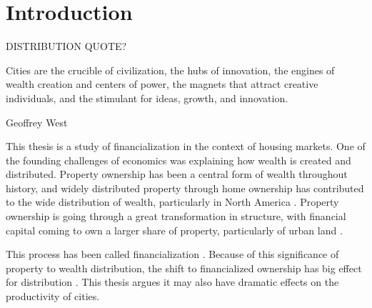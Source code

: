 \chapter{Introduction} \label{chapter-introduction}

\epigraph{DISTRIBUTION QUOTE?}{}
\epigraph{Cities are the crucible of civilization, the hubs of innovation, the engines of wealth creation and centers of power, the magnets that attract creative individuals, and the stimulant for ideas, growth, and innovation.}{Geoffrey West}

This thesis is a study of financialization in the context of housing markets.
One of the founding challenges of economics was explaining how wealth is created and distributed. Property ownership has  been a central form of wealth %
throughout history,  
and widely distributed property through home ownership has contributed to the wide distribution of wealth, particularly in North America \cite{pikettyCapitalTwentyfirstCentury2014}. %
Property ownership is going through a great transformation in structure, with financial capital coming to own a larger share of property,  particularly of urban land \cite{farhaReportFinancializationHousing2017, palleyFinancializationWhatIt2007}. %

This process has been called financialization \cite{farhaReportFinancializationHousing2017, hansenFinanceCapitalismFinancialization2014}. 
Because of this significance of property to wealth distribution, the shift to financialized ownership %
has big effect for distribution \cite{tomaskovic-deveyFinancializationCausesInequality2013, palleyFinancializationWhatIt2007, seccarecciaUnderstandingFinancializationHistory2013, nemtinFinancializationHousingSocial2021}. %
This thesis argues it may also have dramatic effects on the productivity of cities.

